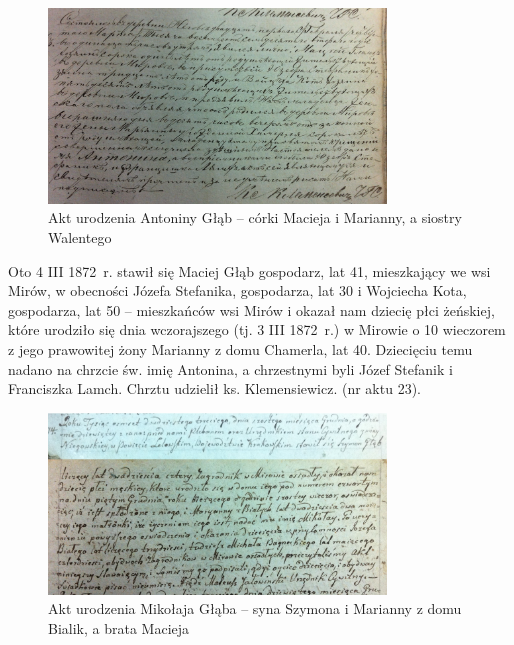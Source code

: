\begin{figure}[!h]
\begin{center}
\includegraphics[width=0.8\textwidth]{zdjecia/akt_urodzenia_antoniny_glab.jpg}
\caption[Akt urodzenia Antoniny Głąb]{Akt urodzenia Antoniny Głąb -- córki Macieja i Marianny, a siostry Walentego}
\label{rys:akt_urodzenia_antoniny_glab}
\end{center}
\end{figure}

Oto 4 III 1872~r. stawił się Maciej Głąb gospodarz, lat 41, mieszkający we wsi Mirów, w obecności Józefa Stefanika, gospodarza, lat 30 i Wojciecha Kota, gospodarza, lat 50 -- mieszkańców wsi Mirów i okazał nam dziecię płci żeńskiej, które urodziło się dnia wczorajszego (tj. 3 III 1872~r.) w Mirowie o 10 wieczorem z jego prawowitej żony Marianny z domu Chamerla, lat 40. Dziecięciu temu nadano na chrzcie św. imię Antonina, a chrzestnymi byli Józef Stefanik i Franciszka Lamch. Chrztu udzielił ks. Klemensiewicz. (nr aktu 23).

\begin{figure}[!h]
\begin{center}
\includegraphics[width=0.8\textwidth]{zdjecia/akt_urodzenia_mikolaja_glaba.jpg}
\caption[Akt urodzenia Mikołaja Głąba]{Akt urodzenia Mikołaja Głąba -- syna Szymona i Marianny z domu Bialik, a brata Macieja}
\label{rys:akt_urodzenia_mikolaja_glaba}
\end{center}
\end{figure}

